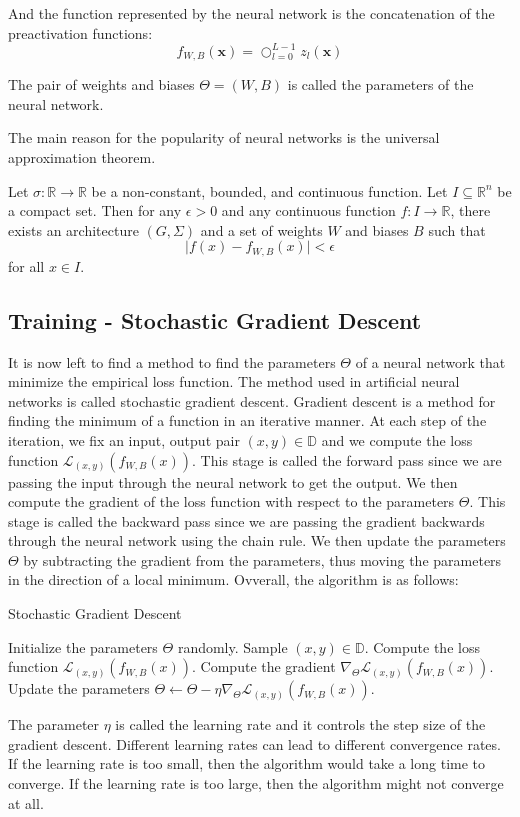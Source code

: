 And the function represented by the neural network is the concatenation of the preactivation functions:
\[
    f_{W,B}(\mathbf{x})=\bigcirc_{l=0}^{L-1} z_l(\mathbf{x})
\]

The pair of weights and biases $\Theta=(W,B)$ is called the parameters of the neural network.

The main reason for the popularity of neural networks is the universal approximation theorem.
\begin{theorem}
    Let $\sigma:\mathbb{R}\to\mathbb{R}$ be a non-constant, bounded, and continuous function.
    Let $I\subseteq\mathbb{R}^n$ be a compact set.
    Then for any $\epsilon>0$ and any continuous function $f:I\to\mathbb{R}$,
    there exists an architecture $(G,\Sigma)$ 
    and a set of weights $W$ and biases $B$ such that
    \[
        \lvert f(x)-f_{W,B}(x)\rvert<\epsilon
    \]
    for all $x\in I$.
\end{theorem}

\subsection{Training - Stochastic Gradient Descent}
It is now left to find a method to find the parameters $\Theta$ of a neural network
that minimize the empirical loss function.
The method used in artificial neural networks is called stochastic gradient descent.
Gradient descent is a method for finding the minimum of a function
in an iterative manner.
At each step of the iteration, 
we fix an input, output pair $(x,y)\in\mathbb{D}$ and we compute the 
loss function $\mathcal{L}_{(x,y)}(f_{W,B}(x))$. This stage is called the forward pass
since we are passing the input through the neural network to get the output.
We then compute the gradient of the loss function with respect to the parameters $\Theta$.
This stage is called the backward pass since we are passing the gradient backwards through the neural network
using the chain rule.
We then update the parameters $\Theta$ by subtracting the gradient from the parameters, thus moving
the parameters in the direction of a local minimum.
Ovverall, the algorithm is as follows:
\begin{algorithm}[H]
    \caption{Stochastic Gradient Descent}
    \begin{algorithmic}[1]
        \State Initialize the parameters $\Theta$ randomly.
            \State Sample $(x,y)\in\mathbb{D}$.
            \State Compute the loss function $\mathcal{L}_{(x,y)}(f_{W,B}(x))$.
            \State Compute the gradient $\nabla_{\Theta}\mathcal{L}_{(x,y)}(f_{W,B}(x))$.
            \State Update the parameters $\Theta\gets\Theta-\eta\nabla_{\Theta}\mathcal{L}_{(x,y)}(f_{W,B}(x))$.
        \EndWhile
    \end{algorithmic}
\end{algorithm}
The parameter $\eta$ is called the learning rate and it controls the step size of the gradient descent.
Different learning rates can lead to different convergence rates.
If the learning rate is too small, then the algorithm would take a long time to converge.
If the learning rate is too large, then the algorithm might not converge at all.

